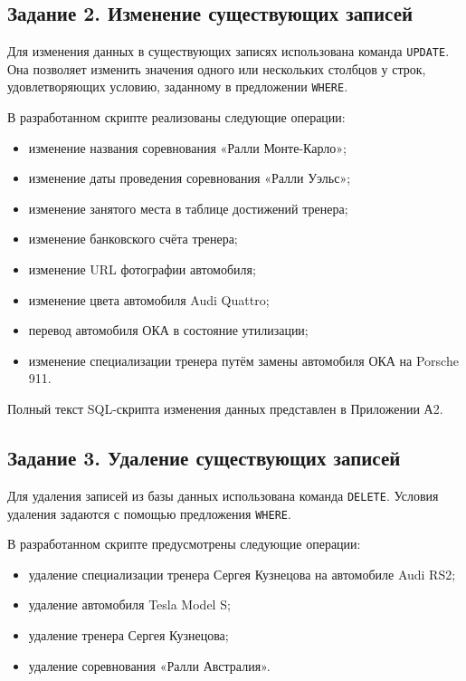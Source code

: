 \documentclass[oneside,a4paper,14pt]{extarticle}
\begin{document}
\subsection{Задание 2. Изменение существующих записей}

Для изменения данных в существующих записях использована команда \texttt{UPDATE}. Она позволяет изменить значения одного или нескольких столбцов у строк, удовлетворяющих условию, заданному в предложении \texttt{WHERE}.

В разработанном скрипте реализованы следующие операции:

\begin{itemize}
    \item изменение названия соревнования «Ралли Монте-Карло»;
    \item изменение даты проведения соревнования «Ралли Уэльс»;
    \item изменение занятого места в таблице достижений тренера;
    \item изменение банковского счёта тренера;
    \item изменение URL фотографии автомобиля;
    \item изменение цвета автомобиля Audi Quattro;
    \item перевод автомобиля ОКА в состояние утилизации;
    \item изменение специализации тренера путём замены автомобиля ОКА на Porsche 911.
\end{itemize}

Полный текст SQL-скрипта изменения данных представлен в Приложении А2.

\subsection{Задание 3. Удаление существующих записей}

Для удаления записей из базы данных использована команда \texttt{DELETE}. Условия удаления задаются с помощью предложения \texttt{WHERE}.

В разработанном скрипте предусмотрены следующие операции:

\begin{itemize}
    \item удаление специализации тренера Сергея Кузнецова на автомобиле Audi RS2;
    \item удаление автомобиля Tesla Model S;
    \item удаление тренера Сергея Кузнецова;
    \item удаление соревнования «Ралли Австралия».
\end{itemize}
\end{document}
